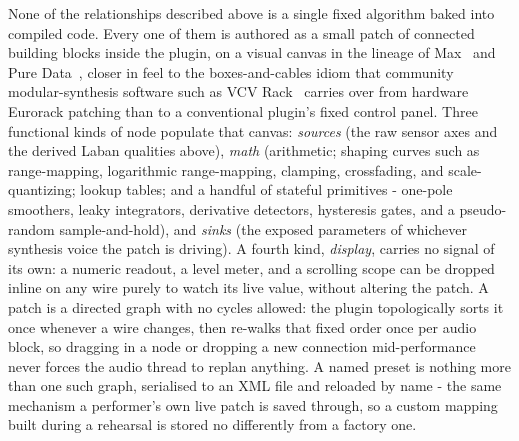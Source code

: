 \documentclass[a4paper,10pt,oneside]{article}
\begin{document}
\begin{sloppy}
None of the relationships described above is a single fixed algorithm baked into
compiled code. Every one of them is authored as a small patch of connected building
blocks inside the plugin, on a visual canvas in the lineage of
Max~\cite{puckette1988patcher} and Pure Data~\cite{puckette1996puredata}, closer in feel
to the boxes-and-cables idiom that community modular-synthesis software such as VCV
Rack~\cite{belt2017vcvrack} carries over from hardware Eurorack patching than to a
conventional plugin's fixed control panel. Three functional kinds of node populate that
canvas: \emph{sources} (the raw sensor axes and the derived Laban qualities above),
\emph{math} (arithmetic; shaping curves such as range-mapping, logarithmic range-mapping,
clamping, crossfading, and scale-quantizing; lookup tables; and a handful of stateful
primitives - one-pole smoothers, leaky integrators, derivative detectors, hysteresis
gates, and a pseudo-random sample-and-hold), and \emph{sinks} (the exposed parameters of
whichever synthesis voice the patch is driving). A fourth kind, \emph{display}, carries
no signal of its own: a numeric readout, a level meter, and a scrolling scope can be
dropped inline on any wire purely to watch its live value, without altering the patch. A
patch is a directed graph with no cycles
allowed: the plugin topologically sorts it once whenever a wire changes, then re-walks
that fixed order once per audio block, so dragging in a node or dropping a new
connection mid-performance never forces the audio thread to replan anything. A named
preset is nothing more than one such graph, serialised to an XML file and reloaded by
name - the same mechanism a performer's own live patch is saved through, so a
custom mapping built during a rehearsal is stored no differently from a factory one.


\end{sloppy}
\end{document}
